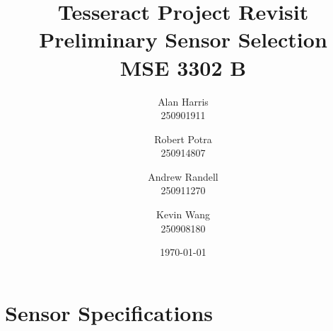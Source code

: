 \documentclass[12pt]{article}
\begin{document}
\title{\textbf{Tesseract Project Revisit\\Preliminary Sensor Selection\\ MSE 3302 B}}
\author{
  Alan Harris\\
  250901911
  \and
  Robert Potra\\
  250914807
  \and
  Andrew Randell\\
  250911270
  \and
  Kevin Wang\\
  250908180
}
\date{\today}
\maketitle

\tableofcontents
\thispagestyle{empty}

\pagebreak
\setcounter{page}{1}

\section{Sensor Specifications}
\end{document}
